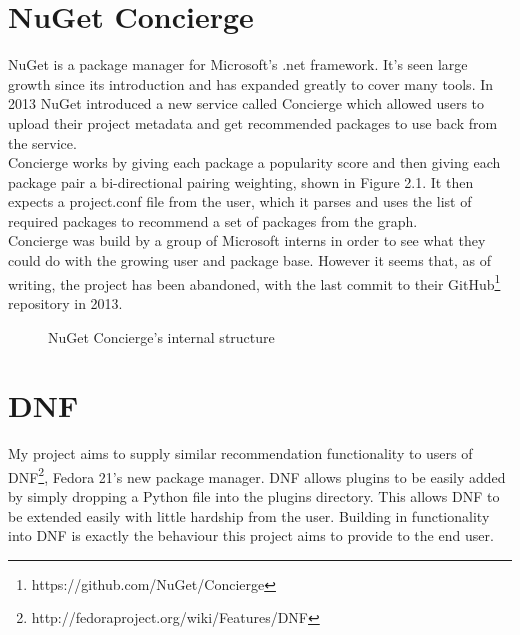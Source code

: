 \documentclass{l4proj}
\begin{document}
\section{NuGet Concierge}
NuGet\cite{nuget} is a package manager for Microsoft's .net framework. It's seen large growth since its introduction and has expanded greatly to cover many tools. In 2013 NuGet introduced a new service called Concierge\cite{concierge} which allowed users to upload their project metadata and get recommended packages to use back from the service.\\
Concierge works by giving each package a popularity score and then giving each package pair a bi-directional pairing weighting, shown in Figure 2.1. It then expects a project.conf file from the user, which it parses and uses the list of required packages to recommend a set of packages from the graph.\\
Concierge was build by a group of Microsoft interns in order to see what they could do with the growing user and package base. However it seems that, as of writing, the project has been abandoned, with the last commit to their GitHub\footnote{https://github.com/NuGet/Concierge} repository in 2013.
\begin{figure}
\centerline{}
\caption{NuGet Concierge's internal structure}
\end{figure}

\section{DNF}
My project aims to supply similar recommendation functionality to users of DNF\footnote{http://fedoraproject.org/wiki/Features/DNF}, Fedora 21's new package manager. DNF allows plugins to be easily added by simply dropping a Python file into the plugins directory. This allows DNF to be extended easily with little hardship from the user. Building in functionality into DNF is exactly the behaviour this project aims to provide to the end user.\\ 
\end{document}
